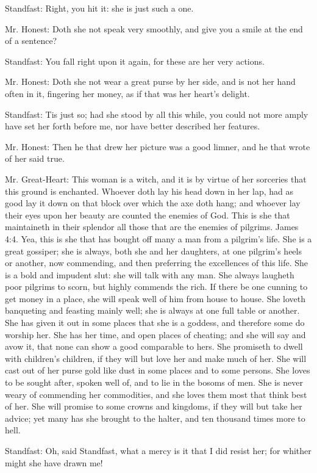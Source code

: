 Standfast: Right, you hit it: she is just such a one.

Mr. Honest: Doth she not speak very smoothly, and give you a smile at the end of a sentence?

Standfast: You fall right upon it again, for these are her very actions.

Mr. Honest: Doth she not wear a great purse by her side, and is not her hand often in it, fingering her money, as if that was her heart's delight.

Standfast: Tis just so; had she stood by all this while, you could not more amply have set her forth before me, nor have better described her features.

Mr. Honest: Then he that drew her picture was a good limner, and he that wrote of her said true.

Mr. Great-Heart: This woman is a witch, and it is by virtue of her sorceries that this ground is enchanted. Whoever doth lay his head down in her lap, had as good lay it down on that block over which the axe doth hang; and whoever lay their eyes upon her beauty are counted the enemies of God. This is she that maintaineth in their splendor all those that are the enemies of pilgrims. James 4:4. Yea, this is she that has bought off many a man from a pilgrim's life. She is a great gossiper; she is always, both she and her daughters, at one pilgrim's heels or another, now commending, and then preferring the excellences of this life. She is a bold and impudent slut: she will talk with any man. She always laugheth poor pilgrims to scorn, but highly commends the rich. If there be one cunning to get money in a place, she will speak well of him from house to house. She loveth banqueting and feasting mainly well; she is always at one full table or another. She has given it out in some places that she is a goddess, and therefore some do worship her. She has her time, and open places of cheating; and she will say and avow it, that none can show a good comparable to hers. She promiseth to dwell with children's children, if they will but love her and make much of her. She will cast out of her purse gold like dust in some places and to some persons. She loves to be sought after, spoken well of, and to lie in the bosoms of men. She is never weary of commending her commodities, and she loves them most that think best of her. She will promise to some crowns and kingdoms, if they will but take her advice; yet many has she brought to the halter, and ten thousand times more to hell.

Standfast: Oh, said Standfast, what a mercy is it that I did resist her; for whither might she have drawn me!


